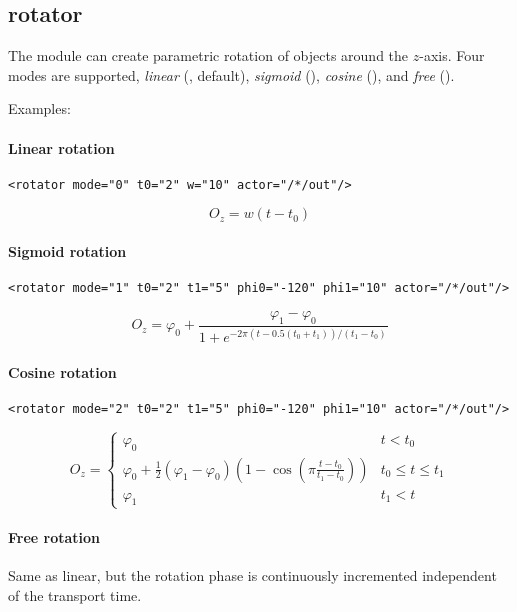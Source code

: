 \subsection{rotator}\label{sec:rotator}

The  module can create parametric rotation of objects
around the $z$-axis. Four modes are supported, {\em linear}
(, default), {\em sigmoid} (), {\em
  cosine} (), and {\em free} ().

Examples:

\paragraph{Linear rotation}

\begin{lstlisting}[numbers=none]
  <rotator mode="0" t0="2" w="10" actor="/*/out"/>
\end{lstlisting}

\begin{equation}
O_z = w (t-t_0)
\end{equation}

\paragraph{Sigmoid rotation}

\begin{lstlisting}[numbers=none]
  <rotator mode="1" t0="2" t1="5" phi0="-120" phi1="10" actor="/*/out"/>
\end{lstlisting}

\begin{equation}
O_z = \varphi_0+\frac{\varphi_1-\varphi_0}{1+e^{-2\pi (t-0.5(t_0+t_1))/(t_1-t_0)}}
\end{equation}

\paragraph{Cosine rotation}

\begin{lstlisting}[numbers=none]
  <rotator mode="2" t0="2" t1="5" phi0="-120" phi1="10" actor="/*/out"/>
\end{lstlisting}

\begin{equation}
O_z = \left\{\begin{array}{ll}
\varphi_0 & t<t_0\\
\varphi_0+\frac12(\varphi_1-\varphi_0)(1-\cos(\pi \frac{t-t_0}{t_1-t_0})) & t_0\le t \le t_1\\
\varphi_1 & t_1 < t
\end{array}\right.
\end{equation}

\paragraph{Free rotation}

Same as linear, but the rotation phase is continuously incremented
independent of the transport time.
